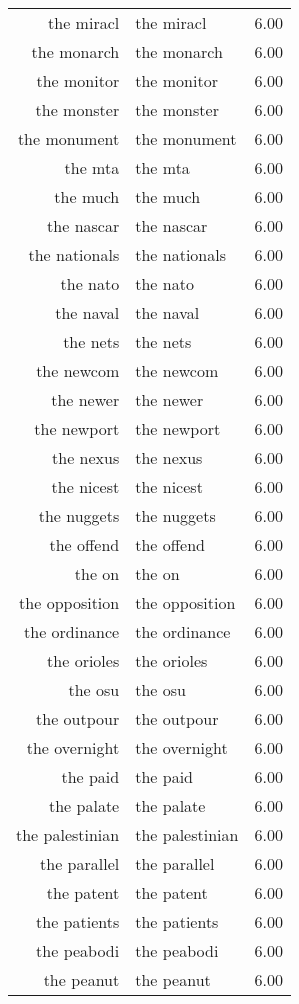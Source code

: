 \begin{table}[ht]
\begin{tabular}{rlr}
  the miracl & the miracl & 6.00 \\ 
  the monarch & the monarch & 6.00 \\ 
  the monitor & the monitor & 6.00 \\ 
  the monster & the monster & 6.00 \\ 
  the monument & the monument & 6.00 \\ 
  the mta & the mta & 6.00 \\ 
  the much & the much & 6.00 \\ 
  the nascar & the nascar & 6.00 \\ 
  the nationals & the nationals & 6.00 \\ 
  the nato & the nato & 6.00 \\ 
  the naval & the naval & 6.00 \\ 
  the nets & the nets & 6.00 \\ 
  the newcom & the newcom & 6.00 \\ 
  the newer & the newer & 6.00 \\ 
  the newport & the newport & 6.00 \\ 
  the nexus & the nexus & 6.00 \\ 
  the nicest & the nicest & 6.00 \\ 
  the nuggets & the nuggets & 6.00 \\ 
  the offend & the offend & 6.00 \\ 
  the on & the on & 6.00 \\ 
  the opposition & the opposition & 6.00 \\ 
  the ordinance & the ordinance & 6.00 \\ 
  the orioles & the orioles & 6.00 \\ 
  the osu & the osu & 6.00 \\ 
  the outpour & the outpour & 6.00 \\ 
  the overnight & the overnight & 6.00 \\ 
  the paid & the paid & 6.00 \\ 
  the palate & the palate & 6.00 \\ 
  the palestinian & the palestinian & 6.00 \\ 
  the parallel & the parallel & 6.00 \\ 
  the patent & the patent & 6.00 \\ 
  the patients & the patients & 6.00 \\ 
  the peabodi & the peabodi & 6.00 \\ 
  the peanut & the peanut & 6.00 \\ 

\end{tabular}
\end{table}
